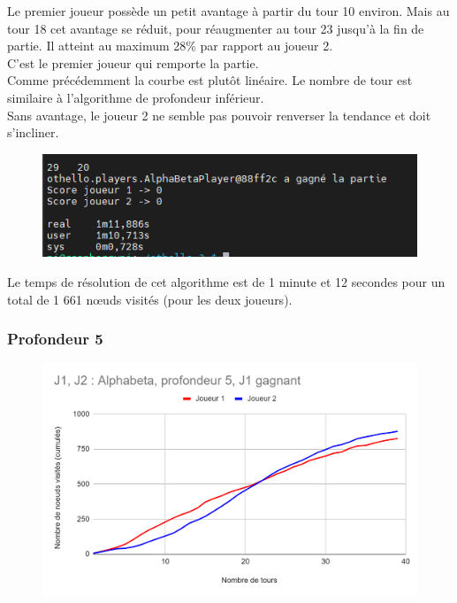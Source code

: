 \documentclass[12pt]{article}
\begin{document}
Le premier joueur possède un petit avantage à partir du tour 10 environ. Mais au tour 18 cet avantage se réduit, pour réaugmenter au tour 23 jusqu'à la fin de partie. Il atteint au maximum 28\% par rapport au joueur 2.\\
C'est le premier joueur qui remporte la partie.\\

Comme précédemment la courbe est plutôt linéaire. Le nombre de tour est similaire à l'algorithme de profondeur inférieur.\\
Sans avantage, le joueur 2 ne semble pas pouvoir renverser la tendance et doit s'incliner.

\begin{figure}[!h]
   \includegraphics[width=\textwidth]{prof4alphabeta-console.png}
\end{figure}

Le temps de résolution de cet algorithme est de 1 minute et 12 secondes pour un total de 1 661 nœuds visités (pour les deux joueurs).

\subsubsection{Profondeur 5}

\begin{figure}[!h]
   \includegraphics[width=\textwidth]{prof5alphabeta.png}
\end{figure}
\end{document}
